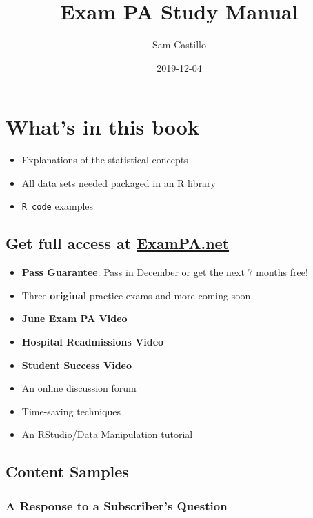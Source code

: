 \documentclass[openany]{book}
\title{Exam PA Study Manual}
\author{Sam Castillo}
\date{2019-12-04}
\providecommand{\tightlist}{%
  \setlength{\itemsep}{0pt}\setlength{\parskip}{0pt}}
\begin{document}
\maketitle

{
\setcounter{tocdepth}{1}
\tableofcontents
}
\hypertarget{whats-in-this-book}{%
\chapter{What's in this book}\label{whats-in-this-book}}

\begin{itemize}
\tightlist
\item
  Explanations of the statistical concepts
\item
  All data sets needed packaged in an R library
\item
  \texttt{R\ code} examples
\end{itemize}

\hypertarget{get-full-access-at-exampa.net}{%
\section{\texorpdfstring{Get full access at \href{https://www.exampa.net/pricing}{ExamPA.net}}{Get full access at ExamPA.net}}\label{get-full-access-at-exampa.net}}

\begin{itemize}
\tightlist
\item
  {\textbf{Pass Guarantee}: Pass in December or get the next 7 months free!}
\item
  Three \textbf{original} practice exams and more coming soon
\item
  \textbf{June Exam PA Video}
\item
  \textbf{Hospital Readmissions Video}
\item
  \textbf{Student Success Video}
\item
  An online discussion forum
\item
  Time-saving techniques
\item
  An RStudio/Data Manipulation tutorial
\end{itemize}

\hypertarget{content-samples}{%
\section{Content Samples}\label{content-samples}}

\hypertarget{a-response-to-a-subscribers-question}{%
\subsection{A Response to a Subscriber's Question}\label{a-response-to-a-subscribers-question}}
\end{document}
